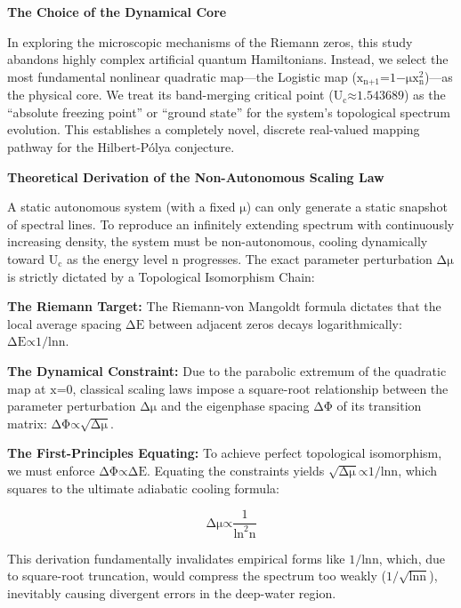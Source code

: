 \textbf{The Choice of the Dynamical Core}

In exploring the microscopic mechanisms of the Riemann zeros, this study
abandons highly complex artificial quantum Hamiltonians. Instead, we
select the most fundamental nonlinear quadratic map---the Logistic map
(\(\text{x}_{\text{n}\text{+1}}\text{=1−}\text{μ}\text{x}_{\text{n}}^{\text{2}}\))---as
the physical core. We treat its band-merging critical point
(\(\text{U}_{\text{c}}\text{≈1.543689}\)) as the ``absolute freezing
point'' or ``ground state'' for the system's topological spectrum
evolution. This establishes a completely novel, discrete real-valued
mapping pathway for the Hilbert-Pólya conjecture.

\textbf{Theoretical Derivation of the Non-Autonomous Scaling Law}

A static autonomous system (with a fixed \(\text{μ}\)) can only generate
a static snapshot of spectral lines. To reproduce an infinitely
extending spectrum with continuously increasing density, the system must
be non-autonomous, cooling dynamically toward \(\text{U}_{\text{c}}\) as
the energy level \(\text{n}\) progresses. The exact parameter
perturbation \(\text{Δ}\text{μ}\) is strictly dictated by a Topological
Isomorphism Chain:

\textbf{The Riemann Target:} The Riemann-von Mangoldt formula dictates
that the local average spacing \(\text{Δ}\text{E}\) between adjacent
zeros decays logarithmically: \(\text{Δ}\text{E}\text{∝1/ln}\text{n}\).

\textbf{The Dynamical Constraint:} Due to the parabolic extremum of the
quadratic map at \(\text{x}\text{=0}\), classical scaling laws impose a
square-root relationship between the parameter perturbation
\(\text{Δ}\text{μ}\) and the eigenphase spacing \(\text{ΔΦ}\) of its
transition matrix: \(\text{ΔΦ∝}\sqrt{\text{Δ}\text{μ}}\).

\textbf{The First-Principles Equating:} To achieve perfect topological
isomorphism, we must enforce \(\text{ΔΦ∝Δ}\text{E}\). Equating the
constraints yields \(\sqrt{\text{Δ}\text{μ}}\text{∝1/ln}\text{n}\),
which squares to the ultimate adiabatic cooling formula:

\[\text{Δ}\text{μ}\text{∝}\frac{\text{1}}{\text{ln}^{\text{2}}\text{n}}\]

This derivation fundamentally invalidates empirical forms like
\(\text{1/ln}\text{n}\), which, due to square-root truncation, would
compress the spectrum too weakly
(\(\text{1/}\sqrt{\text{ln}\text{n}}\)), inevitably causing divergent
errors in the deep-water region.

